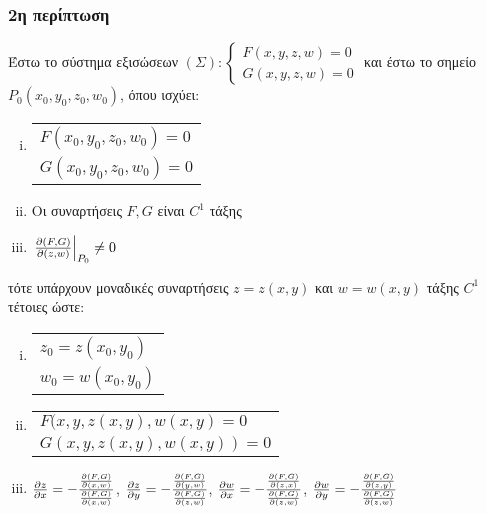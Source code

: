 \subsubsection{2η περίπτωση}

Έστω το σύστημα εξισώσεων $(\Sigma):
\begin{cases}
    F(x,y,z,w) = 0  \\
    G(x,y,z,w) = 0
\end{cases}$
και έστω το σημείο $ P_0(x_0,y_0,z_0,w_0) $, όπου ισχύει:
\begin{enumerate}[(i)]
    \item  \begin{tabular}{l}
            $F(x_0,y_0,z_0,w_0) = 0$ \\
            $G(x_0,y_0,z_0,w_0) = 0$
        \end{tabular}
    \item Οι συναρτήσεις $ F, G $ είναι $ C^{1} $ τάξης 
    \item $ \left.\pdv{(F,G)}{(z,w)}\right|_{P_0} \neq 0 $ 
\end{enumerate}
τότε υπάρχουν μοναδικές συναρτήσεις $ z = z(x,y) $ και $ w = w(x,y) $ τάξης 
$ C^{1} $ τέτοιες ώστε:
\begin{enumerate}[(i)]
    \item \begin{tabular}{l}
            $ z_0 = z(x_0,y_0) $ \\
            $ w_0 = w(x_0,y_0) $
        \end{tabular}
    \item \begin{tabular}{l}
            $ F(x,y,z(x,y), w(x,y) = 0 $ \\
            $ G(x,y,z(x,y), w(x,y)) = 0 $
        \end{tabular}
    \item $ \pdv{z}{x} = - \frac{\pdv{(F,G)}{(x,w)}}{\pdv{(F,G)}{(x,w)}} $, 
        $ \pdv{z}{y} = -
        \frac{\pdv{(F,G)}{(y,w)}}{\pdv{(F,G)}{(z,w)}} $, $ \pdv{w}{x} = -
        \frac{\pdv{(F,G)}{(z,x)}}{\pdv{(F,G)}{(z,w)}} $, $ \pdv{w}{y} = -
        \frac{\pdv{(F,G)}{(z,y)}}{\pdv{(F,G)}{(z,w)}} $
\end{enumerate}

